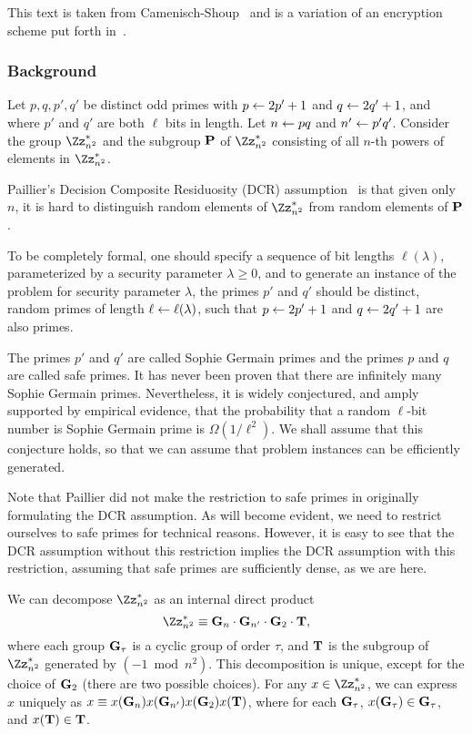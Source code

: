This text is taken from Camenisch-Shoup~\cite{camsho03} and is a variation of an
encryption scheme put forth in~\cite{crasho02}.

\subsubsection{Background}
Let $p, q, p', q'$ be distinct odd primes with $p \gets 2p'+1$ and $q \gets 2q'+1$,
and where $p'$ and $q'$ are both $\ell$ bits in length.
Let $n \gets pq$ and $n' \gets p'q'$.
Consider the group $\Z{n^2}^*$ and the subgroup $\mathbf{P}$ of $\Z{n^2}^*$
consisting of all $n$-th powers of elements in $\Z{n^2}^*$.

Paillier's Decision Composite Residuosity (DCR) assumption~\cite{pailli99}
is that given only $n$, 
it is hard to distinguish random elements of
$\Z{n^2}^*$ from random elements of $\mathbf{P}$.

To be completely formal, one should  specify a sequence of
bit lengths $\ell(\lambda)$, parameterized by a security parameter 
$\lambda \ge 0$, 
and to generate an instance of the problem for security parameter $\lambda$,
the primes $p'$ and $q'$ should be distinct, random primes of length
$\ell \gets \ell(\lambda)$, such that $p \gets 2p'+1$ and $q \gets 2q'+1$
are also primes.

The primes $p'$ and $q'$ are called Sophie Germain primes and
the primes $p$ and $q$ are called safe primes.
It has never been proven that there are infinitely many
Sophie Germain primes.
Nevertheless, it is widely conjectured, and amply supported by
empirical evidence, that the probability that a random $\ell$-bit 
number is Sophie Germain prime is $\Omega(1/\ell^2)$.
We shall assume that this conjecture holds, so that we can assume
that problem instances can be efficiently generated.

Note that Paillier did not make the restriction to safe primes
in originally formulating the DCR assumption.
As will become evident, we need to restrict ourselves to
safe primes for technical reasons.
However, it is easy to see that the DCR assumption without this
restriction implies the DCR assumption with this restriction,
assuming that safe primes are sufficiently dense, as we are here.

We can decompose $\Z{n^2}^*$ as an internal direct product
$$
\Z{n^2}^* \equiv \GG_n \cdot  \GG_{n'} \cdot  \GG_2 \cdot \TT,
$$
where each group $\mathbf{G}_\tau$ is a cyclic group of order $\tau$,
and $\mathbf{T}$ is the subgroup of $\Z{n^2}^*$ generated by $(-1 \bmod n^2)$.
This decomposition is unique, except for the choice of $\mathbf{G}_2$
(there are two possible choices).
For any $x \in \Z{n^2}^*$, we can express $x$ uniquely
as $x \equiv x(\mathbf{G}_n) x(\mathbf{G}_{n'}) x(\mathbf{G}_2) x(\mathbf{T})$,
where for each $\mathbf{G}_\tau$,
$x(\mathbf{G}_\tau) \in \mathbf{G}_\tau$,
and $x(\mathbf{T}) \in \mathbf{T}$.

